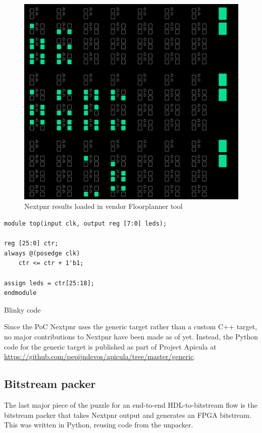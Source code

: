 \documentclass{article}
\begin{document}
\begin{figure}
    \centering
    \includegraphics[width=\textwidth]{fig/floorplanner.png}
    \caption{Nextpnr results loaded in vendor Floorplanner tool}
    \label{fig:floorplanner}
\end{figure}

\begin{listing}
        \centering
\begin{verbatim}
module top(input clk, output reg [7:0] leds);

reg [25:0] ctr;
always @(posedge clk)
	ctr <= ctr + 1'b1;
	
assign leds = ctr[25:18];
endmodule
\end{verbatim}
    \caption{Blinky code}
    \label{fig:blinky}
\end{listing}

Since the PoC Nextpnr uses the generic target rather than a custom C++ target, no major contributions to Nextpnr have been made as of yet. Instead, the Python code for the generic target is published as part of Project Apicula at \url{https://github.com/pepijndevos/apicula/tree/master/generic}.

\subsection{Bitstream packer}

The last major piece of the puzzle for an end-to-end HDL-to-bitstream flow is the bitstream packer that takes Nextpnr output and generates an FPGA bitstream. This was written in Python, reusing code from the unpacker.
\end{document}
